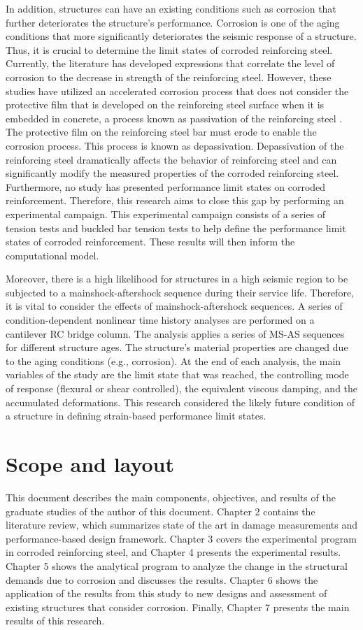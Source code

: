 In addition, structures can have an existing conditions such as corrosion that further deteriorates the structure's performance. Corrosion is one of the aging conditions that more significantly deteriorates the seismic response of a structure. Thus, it is crucial to determine the limit states of corroded reinforcing steel. Currently, the literature has developed expressions that correlate the level of corrosion to the decrease in strength of the reinforcing steel\cite{Yuan2017a}\cite{Du2005}. However, these studies have utilized an accelerated corrosion process that does not consider the protective film that is developed on the reinforcing steel surface when it is embedded in concrete, a process known as passivation of the reinforcing steel \cite{Mehta2014}\cite{Ghods2009}. The protective film on the reinforcing steel bar must erode to enable the corrosion process. This process is known as depassivation. Depassivation of the reinforcing steel dramatically affects the behavior of reinforcing steel and can significantly modify the measured properties of the corroded reinforcing steel.
Furthermore, no study has presented performance limit states on corroded reinforcement. Therefore, this research aims to close this gap by performing an experimental campaign. This experimental campaign consists of a series of tension tests and buckled bar tension tests to help define the performance limit states of corroded reinforcement. These results will then inform the computational model.

Moreover, there is a high likelihood for structures in a high seismic region to be subjected to a mainshock-aftershock sequence during their service life. Therefore, it is vital to consider the effects of mainshock-aftershock sequences. A series of condition-dependent nonlinear time history analyses are performed on a cantilever RC bridge column. The analysis applies a series of MS-AS sequences for different structure ages. The structure's material properties are changed due to the aging conditions (e.g., corrosion). At the end of each analysis, the main variables of the study are the limit state that was reached, the controlling mode of response (flexural or shear controlled), the equivalent viscous damping, and the accumulated deformations. This research considered the likely future condition of a structure in defining strain-based performance limit states.

\section{Scope and layout}
This document describes the main components, objectives, and results of the graduate studies of the author of this document. Chapter 2 contains the literature review, which summarizes state of the art in damage measurements and performance-based design framework. Chapter 3 covers the experimental program in corroded reinforcing steel, and Chapter 4 presents the experimental results. Chapter 5  shows the analytical program to analyze the change in the structural demands due to corrosion and discusses the results. Chapter 6 shows the application of the results from this study to new designs and assessment of existing structures that consider corrosion. Finally, Chapter 7 presents the main results of this research. 